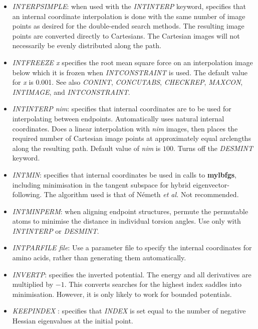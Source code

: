 \documentclass[12pt,a4paper,dvips]{article}
\begin{document}
\begin{itemize}
\item {\it INTERPSIMPLE\/}: when used with the {\it INTINTERP\/} keyword,
  specifies that an internal coordinate interpolation is done with the same
  number of image points as desired for the double-ended search methods. The
  resulting image points are converted directly to Cartesians. The Cartesian
  images will not necessarily be evenly distributed along the path.

\item{\it INTFREEZE x\/} specifies the root mean square force on an
interpolation image below which it is frozen
when {\it INTCONSTRAINT\/} is used. The default value for {\it x\/} is 0.001.
See also
{\it CONINT\/},
{\it CONCUTABS\/},
{\it CHECKREP\/},
{\it MAXCON\/},
{\it INTIMAGE\/}, and
{\it INTCONSTRAINT\/}.

\item {\it INTINTERP nim\/}: specifies that internal coordinates are to be
  used for interpolating between
  endpoints. Automatically uses natural internal coordinates. Does a linear
  interpolation with {\it nim\/} images, then places the required number of
  Cartesian image points at approximately equal arclengths along the resulting
  path. Default value of {\it nim\/} is $100$. Turns off the {\it DESMINT\/} keyword.

\item {\it INTMIN\/}: specifies that internal coordinates be used in calls to {\bf mylbfgs},
including minimisation in the tangent subspace for hybrid eigenvector-following.
The algorithm used is that of N\'emeth {\it et al.\/}\cite{NemethCMA00}
Not recommended.

\item {\it INTMINPERM\/}: when aligning endpoint structures, permute the
  permutable atoms to minimise the distance in individual torsion angles. Use
  only with {\it INTINTERP\/} or {\it DESMINT\/}.

\item {\it INTPARFILE file\/}: Use a parameter file to specify the internal
  coordinates for amino acids, rather than generating them automatically. 

\item{\it INVERTP}: specifies the inverted potential. The energy and all derivatives
are multiplied by $-1$. 
This converts searches for the highest index saddles into minimisation. 
However, it is only likely to work for bounded potentials.

\item {\it KEEPINDEX \/}: specifies that {\it INDEX\/} is set equal to
      the number of negative Hessian eigenvalues at the initial point.


\end{itemize}
\end{document}

